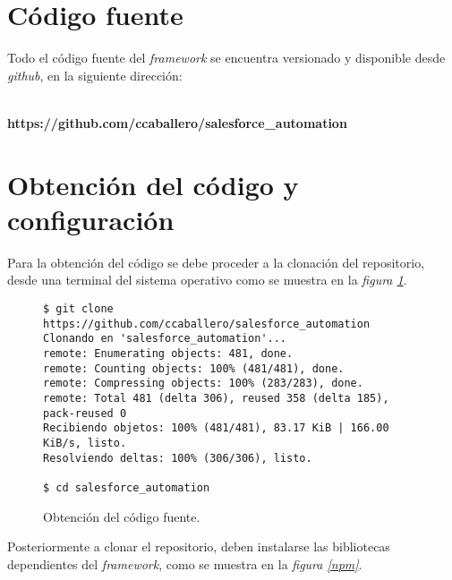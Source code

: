 \section{Código fuente}
Todo el código fuente del \emph{framework} se encuentra versionado y disponible
desde \emph{github}, en la siguiente dirección:
\\
\\
\centerline{\textbf{https://github.com/ccaballero/salesforce\_automation}}

\section{Obtención del código y configuración}
Para la obtención del código se debe proceder a la clonación del repositorio,
desde una terminal del sistema operativo como se muestra en la
\emph{figura \ref{clone}}.

\begin{figure}[H]
\footnotesize
\begin{verbatim}
$ git clone https://github.com/ccaballero/salesforce_automation
Clonando en 'salesforce_automation'...
remote: Enumerating objects: 481, done.
remote: Counting objects: 100% (481/481), done.
remote: Compressing objects: 100% (283/283), done.
remote: Total 481 (delta 306), reused 358 (delta 185), pack-reused 0
Recibiendo objetos: 100% (481/481), 83.17 KiB | 166.00 KiB/s, listo.
Resolviendo deltas: 100% (306/306), listo.

$ cd salesforce_automation
\end{verbatim}
\caption{Obtención del código fuente.}
\label{clone}
\end{figure}

Posteriormente a clonar el repositorio, deben instalarse las bibliotecas
dependientes del \emph{framework}, como se muestra en la
\emph{figura \ref{npm}}.

